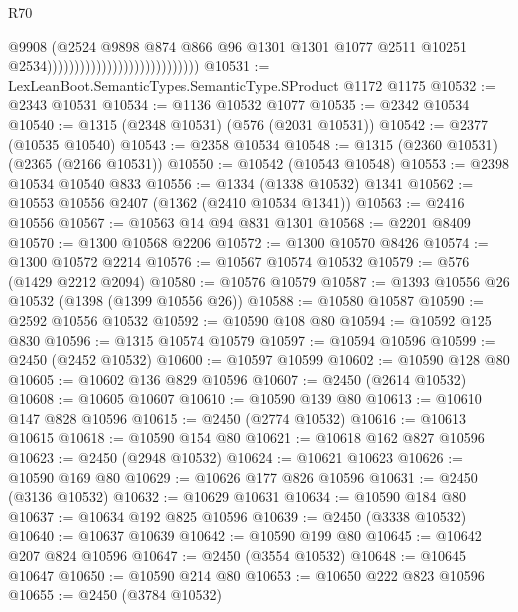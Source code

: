 \begin{lexlean}{R70}
\begin{coremodule}
                                                          @9908
                                                          (@2524
                                                            @9898
                                                            @874
                                                            @866
                                                            @96
                                                            @1301
                                                            @1301
                                                            @1077
                                                            @2511
                                                            @10251
                                                            @2534))))))))))))))))))))))))))))
@10531 := LexLeanBoot.SemanticTypes.SemanticType.SProduct @1172 @1175
@10532 := @2343 @10531
@10534 := @1136 @10532 @1077
@10535 := @2342 @10534
@10540 := @1315 (@2348 @10531) (@576 (@2031 @10531))
@10542 := @2377 (@10535 @10540)
@10543 := @2358 @10534
@10548 := @1315 (@2360 @10531) (@2365 (@2166 @10531))
@10550 := @10542 (@10543 @10548)
@10553 := @2398 @10534 @10540 @833
@10556 := @1334 (@1338 @10532) @1341
@10562 := @10553 @10556 @2407 (@1362 (@2410 @10534 @1341))
@10563 := @2416 @10556
@10567 := @10563 @14 @94 @831 @1301
@10568 := @2201 @8409
@10570 := @1300 @10568 @2206
@10572 := @1300 @10570 @8426
@10574 := @1300 @10572 @2214
@10576 := @10567 @10574 @10532
@10579 := @576 (@1429 @2212 @2094)
@10580 := @10576 @10579
@10587 := @1393 @10556 @26 @10532 (@1398 (@1399 @10556 @26))
@10588 := @10580 @10587
@10590 := @2592 @10556 @10532
@10592 := @10590 @108 @80
@10594 := @10592 @125 @830
@10596 := @1315 @10574 @10579
@10597 := @10594 @10596
@10599 := @2450 (@2452 @10532)
@10600 := @10597 @10599
@10602 := @10590 @128 @80
@10605 := @10602 @136 @829 @10596
@10607 := @2450 (@2614 @10532)
@10608 := @10605 @10607
@10610 := @10590 @139 @80
@10613 := @10610 @147 @828 @10596
@10615 := @2450 (@2774 @10532)
@10616 := @10613 @10615
@10618 := @10590 @154 @80
@10621 := @10618 @162 @827 @10596
@10623 := @2450 (@2948 @10532)
@10624 := @10621 @10623
@10626 := @10590 @169 @80
@10629 := @10626 @177 @826 @10596
@10631 := @2450 (@3136 @10532)
@10632 := @10629 @10631
@10634 := @10590 @184 @80
@10637 := @10634 @192 @825 @10596
@10639 := @2450 (@3338 @10532)
@10640 := @10637 @10639
@10642 := @10590 @199 @80
@10645 := @10642 @207 @824 @10596
@10647 := @2450 (@3554 @10532)
@10648 := @10645 @10647
@10650 := @10590 @214 @80
@10653 := @10650 @222 @823 @10596
@10655 := @2450 (@3784 @10532)

\end{coremodule}
\end{lexlean}
